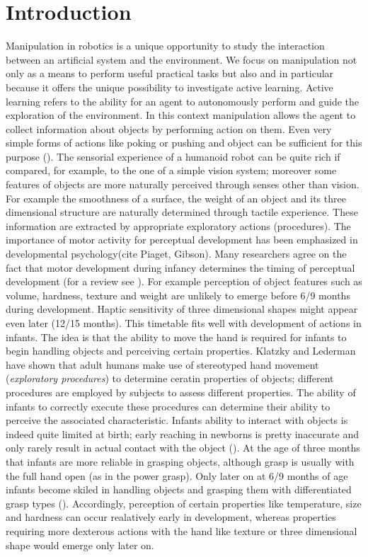\section{Introduction}
Manipulation in robotics is a unique opportunity to study the interaction between an artificial system and the environment. We focus on manipulation not only as a means to perform useful practical tasks but also and in particular because it offers the unique possibility to investigate active learning. Active learning refers to the ability for an agent to autonomously perform and guide the exploration of the environment. In this context manipulation allows the agent to collect information about objects by performing action on them. Even very simple forms of actions like poking or pushing and object can be sufficient for this purpose (\cite{fitzpatrick03learning}).
The sensorial experience of a humanoid robot can be quite rich if compared, for example, to the one of a simple vision system; moreover some features of objects are more naturally perceived through senses other than vision. For example the smoothness of a surface, the weight of an object and its three dimensional structure are naturally determined through tactile experience. These information are extracted by appropriate exploratory actions (procedures).
The importance of motor activity for perceptual development has been emphasized in developmental psychology(cite Piaget, Gibson). Many researchers agree on the fact that motor development during infancy determines the timing of perceptual development (for a review see \cite{bushnell93motor}). For example perception of object features such as volume, hardness, texture and weight are unlikely to emerge before 6/9 months during development. Haptic sensitivity of three dimensional shapes might appear even later (12/15 months). This timetable fits well with development of actions in infants. The idea is that the ability to move the hand is required for infants to begin handling objects and perceiving certain properties. Klatzky and Lederman have shown that adult humans make use of stereotyped hand movement (\emph{exploratory procedures}) to determine ceratin properties of objects; different procedures are employed by subjects to assess different properties. The ability of infants to correctly execute these procedures can determine their ability to perceive the associated characteristic. Infants ability to interact with objects is indeed quite limited at birth; early reaching in newborns is pretty inaccurate and only rarely result in actual contact with the object (\cite{hofsten82eye-hand}). At the age of three months that infants are more reliable in grasping objects, although grasp is usually with the full hand open (as in the power grasp). Only later on at 6/9 months of age infants become skiled in handling objects and grasping them with differentiated grasp types (\cite{hofsten93thestructuring}). Accordingly, perception of certain properties like temperature, size and hardness can occur realatively early in development, whereas properties requiring more dexterous actions with the hand like texture or three dimensional shape would emerge only later on.

